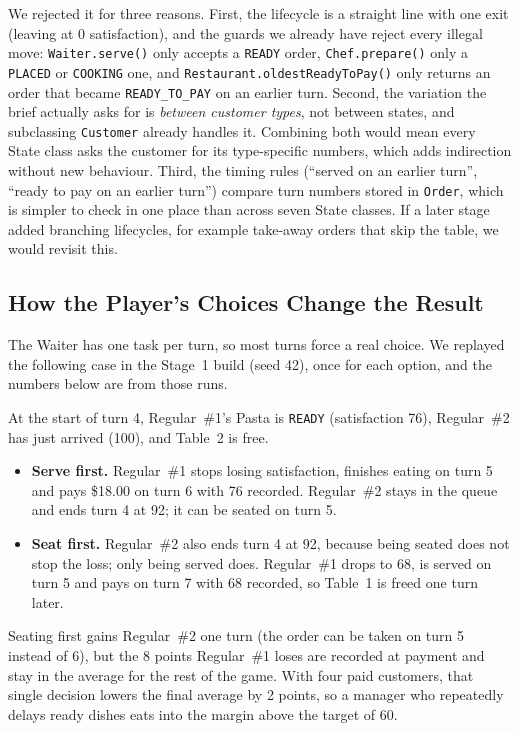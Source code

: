 We rejected it for three reasons. First, the lifecycle is a straight line with one exit (leaving at 0 satisfaction), and the guards we already have reject every illegal move: \texttt{Waiter.serve()} only accepts a \texttt{READY} order, \texttt{Chef.prepare()} only a \texttt{PLACED} or \texttt{COOKING} one, and \texttt{Restaurant.oldestReadyToPay()} only returns an order that became \texttt{READY\_TO\_PAY} on an earlier turn. Second, the variation the brief actually asks for is \emph{between customer types}, not between states, and subclassing \texttt{Customer} already handles it. Combining both would mean every State class asks the customer for its type-specific numbers, which adds indirection without new behaviour. Third, the timing rules (``served on an earlier turn'', ``ready to pay on an earlier turn'') compare turn numbers stored in \texttt{Order}, which is simpler to check in one place than across seven State classes. If a later stage added branching lifecycles, for example take-away orders that skip the table, we would revisit this.

\subsection{How the Player's Choices Change the Result}

The Waiter has one task per turn, so most turns force a real choice. We replayed the following case in the Stage~1 build (seed 42), once for each option, and the numbers below are from those runs.

At the start of turn 4, Regular~\#1's Pasta is \texttt{READY} (satisfaction 76), Regular~\#2 has just arrived (100), and Table~2 is free.

\begin{itemize}[leftmargin=*]
  \item \textbf{Serve first.} Regular~\#1 stops losing satisfaction, finishes eating on turn 5 and pays \$18.00 on turn 6 with 76 recorded. Regular~\#2 stays in the queue and ends turn 4 at 92; it can be seated on turn 5.
  \item \textbf{Seat first.} Regular~\#2 also ends turn 4 at 92, because being seated does not stop the loss; only being served does. Regular~\#1 drops to 68, is served on turn 5 and pays on turn 7 with 68 recorded, so Table~1 is freed one turn later.
\end{itemize}

Seating first gains Regular~\#2 one turn (the order can be taken on turn 5 instead of 6), but the 8 points Regular~\#1 loses are recorded at payment and stay in the average for the rest of the game. With four paid customers, that single decision lowers the final average by 2 points, so a manager who repeatedly delays ready dishes eats into the margin above the target of 60.

